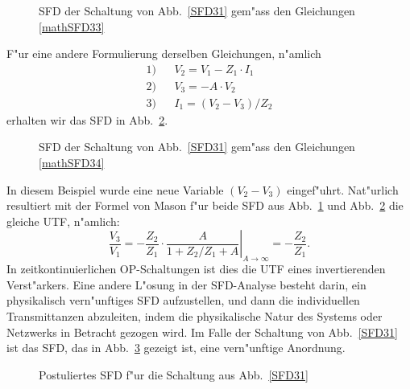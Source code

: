\begin{figure}[htb!]
\begin{center}
  \caption{SFD der Schaltung von Abb.~\ref{SFD31} gem"ass den Gleichungen \ref{mathSFD33}}\label{SFD33}
\end{center}
\vspace*{-7mm}
\end{figure}
F"ur eine andere Formulierung derselben Gleichungen, n"amlich\\
\begin{eqnarray}
  1) & & V_2 = V_1 -Z_1\cdot I_1 \nonumber \\
  2) & & V_3 = -A\cdot V_2 \label{mathSFD34}\\
  3) & & I_1 = (V_2-V_3)/Z_2  \nonumber
\end{eqnarray}
erhalten wir das SFD in Abb.~\ref{SFD34}.
\begin{figure}[htb!]
\begin{center}
  \caption{SFD der Schaltung von Abb.~\ref{SFD31} gem"ass den Gleichungen \ref{mathSFD34}}\label{SFD34}
\end{center}
\vspace*{-7mm}
\end{figure}
In diesem Beispiel wurde eine neue Variable $(V_2-V_3)$ eingef"uhrt.
Nat"urlich resultiert mit der Formel von Mason f"ur beide SFD aus
Abb.~\ref{SFD33} und Abb.~\ref{SFD34} die gleiche UTF, n"amlich:
\begin{equation}
 \frac{V_3}{V_1} = -\frac{Z_2}{Z_1}\cdot \left. \frac{A}{1+Z_2/Z_1+A}\right |_{A\rightarrow\infty} = -\frac{Z_2}{Z_1}. \label{mathSFD35}
\end{equation}
In zeitkontinuierlichen OP-Schaltungen ist dies die UTF eines
invertierenden Verst"arkers.  Eine andere L"osung in der SFD-Analyse
besteht darin, ein physikalisch vern"unftiges SFD aufzustellen, und
dann die individuellen Transmittanzen abzuleiten, indem die
physikalische Natur des Systems oder Netzwerks in Betracht gezogen
wird. Im Falle der Schaltung von Abb.~\ref{SFD31} ist das SFD, das in
Abb.~\ref{SFD35} gezeigt ist, eine vern"unftige Anordnung.\\
\begin{figure}[htb!]
\vspace*{-2mm}
\begin{center}
  \caption{Postuliertes SFD f"ur die Schaltung aus Abb.~\ref{SFD31}}\label{SFD35}
\end{center}
\vspace*{-7mm}
\end{figure}\\
